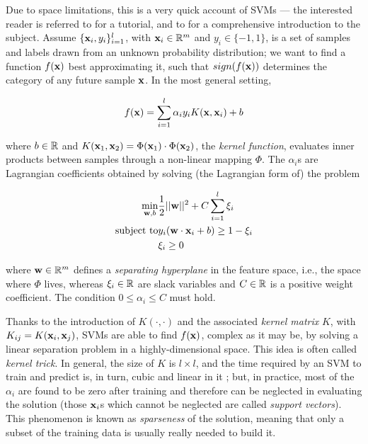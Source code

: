 Due to space limitations, this is a very quick account of SVMs --- the
interested reader is referred to \cite{Burges98,SmolaTut2004} for a
tutorial, and to \cite{Cristianini00} for a comprehensive introduction
to the subject. Assume $\{\mathbf{x}_i,y_i\}_{i=1}^l$, with $\mathbf{x}_i \in \mathbb{R}^m$
and $y_i \in \{-1,1\}$, is a set of samples and labels drawn from an
unknown probability distribution; we want to find a function $f(\mathbf{x})$
best approximating it, such that $sign(f(\mathbf{x}))$ determines the
category of any future sample $\mathbf{x}$. In the most general setting,

\begin{equation} \label{eqn:sol}
  f(\mathbf{x}) = \sum_{i=1}^l \alpha_i y_i K(\mathbf{x},\mathbf{x}_i) + b
\end{equation}

\noindent where $b \in \mathbb{R}$ and $K(\mathbf{x}_1,\mathbf{x}_2) = \Phi(\mathbf{x}_1)
\cdot \Phi(\mathbf{x}_2)$, the \emph{kernel function}, evaluates inner
products between samples through a non-linear mapping $\Phi$. The
$\alpha_i$s are Lagrangian coefficients obtained by solving (the
Lagrangian form of) the problem

\begin{eqnarray} \label{eqn:svm_primal}
  \min_{\mathbf{w},b}      & \frac{1}{2} ||\mathbf{w}||^2 + C \sum_{i=1}^l \xi_i \\
  \mbox{subject to} & y_i (\mathbf{w}\cdot\mathbf{x}_i + b) \geq 1-\xi_i         \nonumber \\
                    & \xi_i \geq 0                                 \nonumber
\end{eqnarray}

\noindent where $\mathbf{w} \in \mathbb{R}^m$ defines a \emph{separating hyperplane}
in the feature space, i.e., the space where $\Phi$ lives, whereas
$\xi_i \in \mathbb{R}$ are slack variables and $C \in \mathbb{R}$ is a positive
weight coefficient. The condition $0 \leq \alpha_i \leq C$ must
hold.

Thanks to the introduction of $K(\cdot,\cdot)$ and the associated
\emph{kernel matrix} $K$, with $K_{ij} = K(\mathbf{x}_i,\mathbf{x}_j)$, SVMs are
able to find $f(\mathbf{x})$, complex as it may be, by solving a linear
separation problem in a highly-dimensional space. This idea is often
called \emph{kernel trick}. In general, the size of $K$ is $l \times
l$, and the time required by an SVM to train and predict is, in turn,
cubic and linear in it \cite{KeerthiCDC06}; but, in practice, most of
the $\alpha_i$ are found to be zero after training and therefore can
be neglected in evaluating the solution (those $\mathbf{x}_i$s which cannot
be neglected are called \emph{support vectors}). This phenomenon is
known as \emph{sparseness} of the solution, meaning that only a subset
of the training data is usually really needed to build it.
